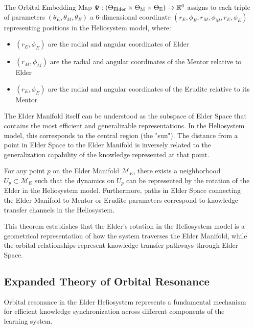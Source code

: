 \begin{definition}
The Orbital Embedding Map $\Psi: (\Theta_{\text{Elder}} \times \Theta_{\text{M}} \times \Theta_{\text{E}}) \rightarrow \mathbb{R}^6$ assigns to each triple of parameters $(\theta_E, \theta_M, \theta_E)$ a 6-dimensional coordinate $(r_E, \phi_E, r_M, \phi_M, r_{E}, \phi_{E})$ representing positions in the Heliosystem model, where:
\begin{itemize}
    \item $(r_E, \phi_E)$ are the radial and angular coordinates of Elder
    \item $(r_M, \phi_M)$ are the radial and angular coordinates of the Mentor relative to Elder
    \item $(r_{E}, \phi_{E})$ are the radial and angular coordinates of the Erudite relative to its Mentor
\end{itemize}
\end{definition}

The Elder Manifold itself can be understood as the subspace of Elder Space that contains the most efficient and generalizable representations. In the Heliosystem model, this corresponds to the central region (the "sun"). The distance from a point in Elder Space to the Elder Manifold is inversely related to the generalization capability of the knowledge represented at that point.

\begin{theorem}
For any point $p$ on the Elder Manifold $\mathcal{M}_E$, there exists a neighborhood $U_p \subset \mathcal{M}_E$ such that the dynamics on $U_p$ can be represented by the rotation of the Elder in the Heliosystem model. Furthermore, paths in Elder Space connecting the Elder Manifold to Mentor or Erudite parameters correspond to knowledge transfer channels in the Heliosystem.
\end{theorem}

This theorem establishes that the Elder's rotation in the Heliosystem model is a geometrical representation of how the system traverses the Elder Manifold, while the orbital relationships represent knowledge transfer pathways through Elder Space.

\subsection{Expanded Theory of Orbital Resonance}

Orbital resonance in the Elder Heliosystem represents a fundamental mechanism for efficient knowledge synchronization across different components of the learning system.

